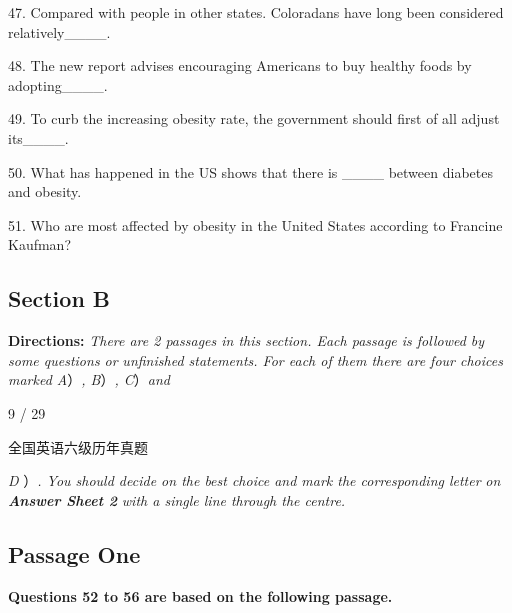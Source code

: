 \documentclass[UTF8,11pt]{ctexart}
\begin{document}
47. Compared with people in other states. Coloradans have long been considered relatively\_\_\_\_.


48. The new report advises encouraging Americans to buy healthy foods by adopting\_\_\_\_.


49. To curb the increasing obesity rate, the government should first of all adjust its\_\_\_\_.


50. What has happened in the US shows that there is \_\_\_\_ between diabetes and obesity.


51. Who are most affected by obesity in the United States according to Francine Kaufman?


\subsection*{\textbf{Section B}}


\textbf{Directions:}\textit{ There are 2 passages in this section. Each passage is followed by some questions or} \textit{unfinished statements. For each of them there are four choices marked A}）\textit{, B}）\textit{, C}）\textit{and}


9 / 29


全国英语六级历年真题


\textit{D} ）\textit{. You should decide on the best choice and mark the corresponding letter} \textit{on}\textbf{\textit{ Answer Sheet 2}}\textit{ with a single line through the centre.}


\subsection*{\textbf{Passage One}}


\textbf{Questions 52 to 56 are based on the following passage.}
\end{document}
